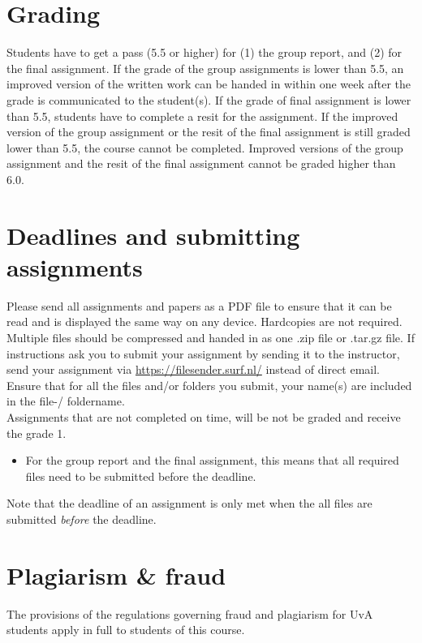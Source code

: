 \documentclass[a4paper,10pt]{report}
\begin{document}
\section{Grading}
Students have to get a pass (5.5 or higher) for (1) the group report, and (2) for the final assignment. If the grade of the group assignments is lower than 5.5, an improved version of the written work can be handed in within one week after the grade is communicated to the student(s). If the grade of final assignment is lower than 5.5, students have to complete a resit for the assignment. If the improved version of the group assignment or the resit of the final assignment is still graded lower than 5.5, the course cannot be completed. Improved versions of the group assignment and the resit of the final assignment cannot be graded higher than 6.0. 

\section{Deadlines and submitting assignments}
Please send all assignments and papers as a PDF file to ensure that it can be read and is displayed the same way on any device. Hardcopies are not required. Multiple files should be compressed and handed in as one .zip file or .tar.gz file. If instructions ask you to submit your assignment by sending it to the instructor, send your assignment via \url{https://filesender.surf.nl/} instead of direct email. Ensure that for all the files and/or folders you submit, your name(s) are included in the file-/ foldername. \\
	
Assignments that are not completed on time, will be not be graded and receive the grade 1. 
	\begin{itemize}
		\item For the group report and the final assignment, this means that all required files need to be submitted before the deadline. 
	\end{itemize}
Note that the deadline of an assignment is only met when the all files are submitted \emph{before} the deadline.

\section{Plagiarism \& fraud}
The provisions of the regulations governing fraud and plagiarism for UvA students apply in full to students of this course. \\
\end{document}
